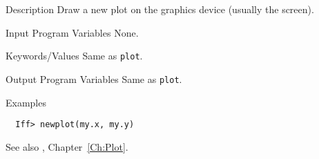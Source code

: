 
\begin{IFFcom}
\item[Description] Draw a new plot on the graphics device (usually the
  screen). 
\item[Input Program Variables] None.
\item[Keywords/Values] Same as {\texttt{plot}}.
\item[Output Program Variables] Same as {\texttt{plot}}.  
\item[Examples] {\hspace{1.in} \vspace{-0.1truein} \relax }
\begin{verbatim} 
  Iff> newplot(my.x, my.y)
\end{verbatim} \noindent %
\item[See also] {},
  Chapter~{\ref{Ch:Plot}}. 
\end{IFFcom}



